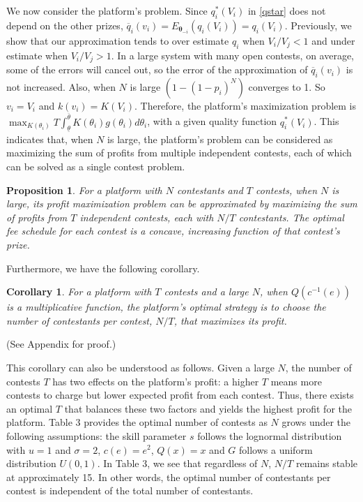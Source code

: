 \documentclass[12pt]{article}
\newtheorem{corollary}{Corollary}
\newtheorem{Proposition}{Proposition}
\begin{document}
We now consider the platform's problem. Since $q_{i}^*(V_{i})$ in \ref{qstar} does not depend on the other prizes, $\overline{q}_{i}(v_{i})=E_{\boldsymbol{\theta}_{-i}}(q_{i}(V_{i}))=q_{i}(V_{i})$.
Previously, we show that our approximation tends to over
estimate $q_{i}$ when $V_{i}/V_{j}<1$ and under estimate when $V_{i}/V_{j}>1$.
In a large system with many open contests, on average, some of the errors will cancel out, so the error of the
approximation of $\overline{q}_{i}(v_{i})$ is not increased. Also,
when $N$ is large $(1-(1-p_{i})^{N})$ converges to 1. So $v_{i}=V_{i}$
and $k(v_{i})=K(V_{i})$. Therefore, the platform's maximization problem
is $\max_{K(\theta_{i})}T\int_{\underline{\theta}}^{\overline{\theta}}K(\theta_{i})g(\theta_{i})d\theta_{i}$,
with a given quality function $q_{i}^*(V_{i})$. This indicates that, when $N$ is large, the platform's problem
can be considered as maximizing the sum of profits from multiple independent contests, each of which can be solved as a single contest problem.

\begin{Proposition} For a platform with $N$ contestants and $T$ contests, when $N$ is large, its profit maximization problem can be approximated by maximizing the sum of profits from $T$ independent contests, each with $N/T$ contestants. The optimal fee schedule for each contest is a concave, increasing function of that contest's prize.
\end{Proposition}

Furthermore, we have the following corollary.
\begin{corollary}\label{cor_NTfixed}
For a platform with $T$ contests and a large $N$, when $Q(c^{-1}(e))$ is a multiplicative function, the platform's optimal strategy is to choose the number of contestants per contest, $N/T$, that maximizes its profit.
\end{corollary}
(See Appendix for proof.)

This corollary can also be understood as follows. Given a large $N$, the number of contests $T$ has two effects on the platform's profit: a higher $T$ means more contests to charge but lower expected
profit from each contest.  Thus, there exists an optimal $T$ that balances these two factors and yields the highest profit for the platform. Table 3 provides the optimal number of contests as $N$ grows under the following assumptions: the skill parameter $s$ follows the lognormal distribution with $u=1$ and $\sigma=2$, $c(e)=e^{2}$, $Q(x)=x$ and $G$ follows a uniform distribution $U(0,1)$. In Table 3, we see that regardless of $N$, $N/T$ remains stable at approximately 15. In other words, the optimal number of contestants per contest is independent of the total number of contestants.
\end{document}
